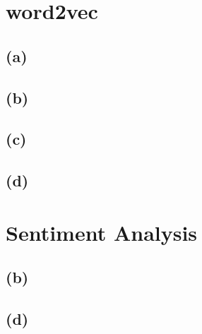 \documentclass[11pt]{article}
\begin{document}
\section{word2vec}
\subsection*{(a)}
\subsection*{(b)}
\subsection*{(c)}
\subsection*{(d)}

\section{Sentiment Analysis}
\subsection*{(b)}

\subsection*{(d)}
\end{document}
